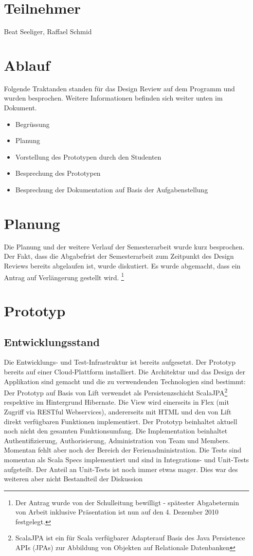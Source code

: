 \section{Teilnehmer}
Beat Seeliger, Raffael Schmid

\section{Ablauf}
Folgende Traktanden standen f\"ur das Design Review auf dem Programm und wurden besprochen. Weitere Informationen befinden sich weiter unten im Dokument.
\begin{itemize} 
\item Begr\"ussung
\item Planung
\item Vorstellung des Prototypen durch den Studenten
\item Besprechung des Prototypen
\item Besprechung der Dokumentation auf Basis der Aufgabenstellung
\end{itemize}

\section{Planung}
Die Planung und der weitere Verlauf der Semesterarbeit wurde kurz besprochen. Der Fakt, dass die Abgabefrist der Semesterarbeit zum Zeitpunkt des Design Reviews bereits abgelaufen ist, wurde diskutiert. Es wurde abgemacht, dass ein Antrag auf Verl\"angerung gestellt wird. \footnote{Der Antrag wurde von der Schulleitung bewilligt - sp\"atester Abgabetermin von Arbeit inklusive Pr\"asentation ist nun auf den 4. Dezember 2010 festgelegt.}


\section{Prototyp}
\subsection{Entwicklungsstand}
Die Entwicklungs- und Test-Infrastruktur ist bereits aufgesetzt. Der Prototyp bereits auf einer Cloud-Plattform installiert. Die Architektur und das Design der Applikation sind gemacht und die zu verwendenden Technologien sind bestimmt: 
Der Prototyp auf Basis von Lift verwendet als Persistenzschicht ScalaJPA\footnote{ScalaJPA ist ein f\"ur Scala  verf\"ugbarer Adapterauf Basis des Java Persistence APIs (JPAs) zur Abbildung von Objekten auf Relationale Datenbanken} respektive im Hintergrund Hibernate. Die View wird einerseits in Flex (mit Zugriff via RESTful Webservices), andererseits mit HTML und den von Lift direkt verf\"ugbaren Funktionen implementiert. Der Prototyp beinhaltet aktuell noch nicht den gesamten Funktionsumfang. Die Implementation beinhaltet Authentifizierung, Authorisierung, Administration von Team und Members. Momentan fehlt aber noch der Bereich der Ferienadministration.
Die Tests sind momentan als Scala Specs implementiert und sind in Integrations- und Unit-Tests aufgeteilt. Der Anteil an Unit-Tests ist noch immer etwas mager. Dies war des weiteren aber nicht Bestandteil der Diskussion



